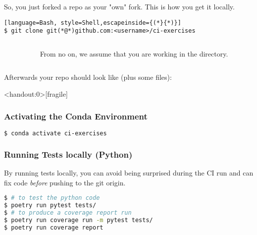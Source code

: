 \begin{frame}[fragile]
	\frametitle{}
	So, you just forked a repo as your "own" fork. This is how you get it locally.
	\begin{lstlisting}[language=Bash, style=Shell,escapeinside={(*}{*)}]
$ git clone git(*@*)github.com:<username>/ci-exercises
	\end{lstlisting}
    \begin{columns}
    	\begin{column}{0.5\textwidth}
    		\centering
    		\begin{minipage}[t]{0.8\textwidth}
    			{\tiny \DTsetlength{0.2em}{1em}{0.2em}{0.4pt}{.6pt}
    				}
    		\end{minipage}
    	\end{column}
        \begin{column}{0.5\textwidth}
        	\begin{hint}
        		{From no on, we assume that you are working in the  directory.}
        	\end{hint}
        \end{column}
    \end{columns}
    Afterwards your repo should look like (plus some files):
   

\end{frame}


\begin{frame}<handout:0>[fragile]
	\frametitle{Activating the Conda Environment}
	\begin{lstlisting}[language=Bash, style=Shell]
$ conda activate ci-exercises
    \end{lstlisting}
\end{frame}

\begin{frame}[fragile]
	\frametitle{Running Tests locally (Python)}
	\begin{warning}
		{By running tests locally, you can avoid being surprised during the CI run and can fix code \emph{before} pushing to the git origin.}
	\end{warning}
    \pause
    \begin{lstlisting}[language=Bash, style=Shell]
$ # to test the python code
$ poetry run pytest tests/
$ # to produce a coverage report run
$ poetry run coverage run -m pytest tests/
$ poetry run coverage report
    \end{lstlisting}	
\end{frame}



